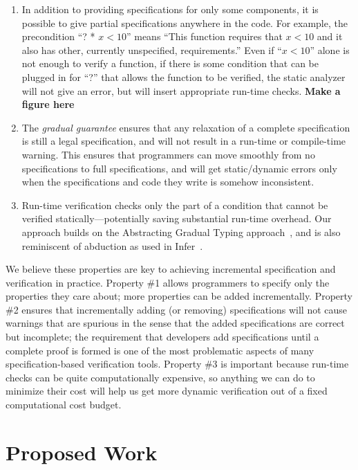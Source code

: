\documentclass[10pt,twocolumn]{article}
\begin{document}
\begin{sloppypar}
\begin{enumerate}

\item
In addition to providing specifications for only some components, it is possible to give partial specifications anywhere in the code.  For example, the precondition ``? * $x<10$'' means ``This function requires that $x<10$ and it also has other, currently unspecified, requirements.''  Even if ``$x<10$'' alone is not enough to verify a function, if there is some condition that can be plugged in for ``?'' that allows the function to be verified, the static analyzer will not give an error, but will insert appropriate run-time checks.  \textbf{Make a figure here}

\item
The \textit{gradual guarantee} ensures that any relaxation of a complete specification is still a legal specification, and will not result in a run-time or compile-time warning.  This ensures that programmers can move smoothly from no specifications to full specifications, and will get static/dynamic errors only when the specifications and code they write is somehow inconsistent.

\item
Run-time verification checks only the part of a condition that cannot be verified statically—potentially saving substantial run-time overhead.  Our approach builds on the Abstracting Gradual Typing approach~\cite{garcia2016abstracting}, and is also reminiscent of abduction as used in Infer~\cite{Calcagno:2011:CSA:2049697.2049700}.

\end{enumerate}

We believe these properties are key to achieving incremental specification and verification in practice.  Property \#1 allows programmers to specify only the properties they care about; more properties can be added incrementally.  Property \#2 ensures that incrementally adding (or removing) specifications will not cause warnings that are spurious in the sense that the added specifications are correct but incomplete; the requirement that developers add specifications until a complete proof is formed is one of the most problematic aspects of many specification-based verification tools.  Property \#3 is important because run-time checks can be quite computationally expensive, so anything we can do to minimize their cost will help us get more dynamic verification out of a fixed computational cost budget.


\section{Proposed Work}


\end{sloppypar}
\end{document}
